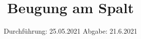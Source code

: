 

\subject{V406}
\title{Beugung am Spalt}
\date{%
  Durchführung: 25.05.2021
  \hspace{3em}
  Abgabe: 21.6.2021
}



\maketitle
\thispagestyle{empty}
\tableofcontents
\newpage







\printbibliography{}


